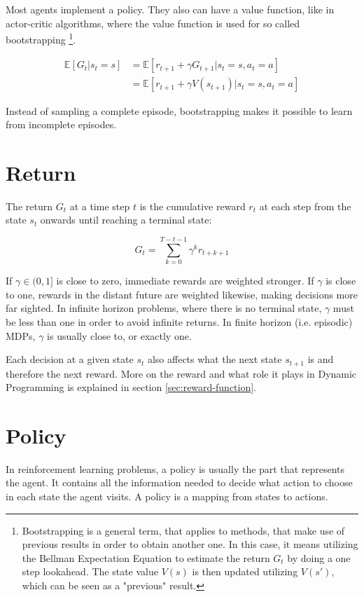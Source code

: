 Most agents implement a policy. They also can have a value function, like in actor-critic algorithms, where the value function is used for so called bootstrapping \footnote{Bootstrapping is a general term, that applies to methods, that make use of previous results in order to obtain another one. In this case, it means utilizing the Bellman Expectation Equation to estimate the return $G_t$ by doing a one step lookahead. The state value $V(s)$ is then updated utilizing $V(s')$, which can be seen as a "previous" result.}.

\begin{align}
\mathbb{E}[G_t|s_t=s] &= \mathbb{E}[r_{t+1} + \gamma G_{t+1}|s_t=s, a_t=a] \\
&=\mathbb{E}[r_{t+1}+ \gamma V(s_{t+1})|s_t=s, a_t=a]
\end{align}

Instead of sampling a complete episode, bootstrapping makes it possible to learn from incomplete episodes.

\section{Return}

The return $G_t$ at a time step $t$ is the cumulative reward $r_t$ at each step from the state $s_t$ onwards until reaching a terminal state:

\begin{equation}
G_t = \sum_{k=0}^{T-t-1}\gamma^k r_{t+k+1}
\end{equation}

If $\gamma \in (0,1]$ is close to zero, immediate rewards are weighted stronger. If $\gamma$ is close to one, rewards in the distant future are weighted likewise, making decisions more far sighted. In infinite horizon problems, where there is no terminal state, $\gamma$ must be less than one in order to avoid infinite returns. In finite horizon (i.e. episodic) MDPs, $\gamma$ is usually close to, or exactly one.

Each decision at a given state $s_t$ also affects what the next state $s_{t+1}$ is and therefore the next reward. More on the reward and what role it plays in Dynamic Programming is explained in section \ref{sec:reward-function}.

\section{Policy}
\label{sec:policy}
In reinforcement learning problems, a policy is usually the part that represents the agent. It contains all the information needed to decide what action to choose in each state the agent visits. A policy is a mapping from states to actions.

